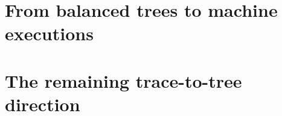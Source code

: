 \section{From balanced trees to machine executions}

\section{The remaining trace-to-tree direction}
